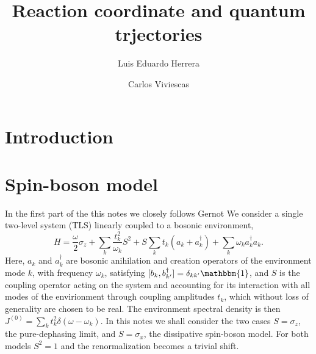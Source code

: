 \documentclass[%
preprint,
onecolumn,
notitlepag,
 amsmath,amssymb,
 aps,
 pra,
]{revtex4-2}
\begin{document}
\title[]{Reaction coordinate and quantum trjectories}
\author{Luis Eduardo Herrera}
\author{Carlos Viviescas}
\begin{abstract}
\end{abstract}
	
\maketitle
%
\section{Introduction}
\section{Spin-boson model}
In the first part of the this notes we closely follows Gernot 
We consider a single two-level system (TLS) linearly coupled to a bosonic environment, 
\begin{equation}
H = \frac{\omega}{2} \sigma_{z}+\sum_{k} \frac{t_{k}^{2}}{\omega_{k}} S^{2}+S \sum_{k} t_{k}\left(a_{k}+a_{k}^{\dagger}\right)+\sum_{k} \omega_{k} a_{k}^{\dagger} a_{k}.
\end{equation}
Here, $a_{k}$ and $a^{\dagger}_{k}$ are bosonic anihilation and creation operators of the environment mode $k$, with frequency $\omega_{k}$, satisfying $[b_{k},b^{\dagger}_{k'}] = \delta_{kk'} \mathbbm{1}$, and $S$ is the coupling operator acting on the system and accounting for its interaction with all modes of the envirionment through coupling amplitudes $t_{k}$, which without loss of generality are chosen to be real. The environment spectral density is then $J^{(0)} = \sum_{k} t_{k}^2 \delta (\omega -  \omega_{k})$.
In this notes we shall consider the two cases $S = \sigma_{z}$, the pure-dephasing limit, and $S = \sigma_{x}$, the dissipative spin-boson model. For both models $S^2 =1$ and the renormalization becomes a trivial shift.
\end{document}
